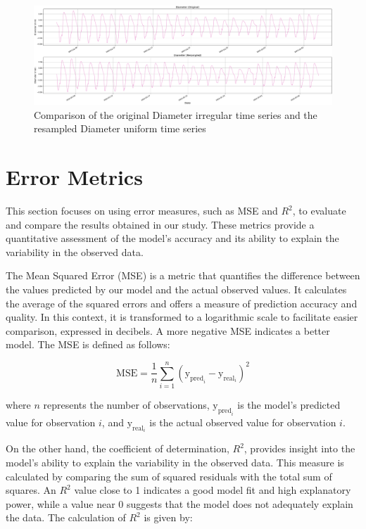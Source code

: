 \begin{figure}[htbp]
    \centering
    \includegraphics[width=15 cm]{5_ChapterDesign/figuras/5_Irregular/comparison_Diameter.pdf}
    \caption{Comparison of the original Diameter irregular time series and the resampled Diameter uniform time series}
    \label{comparison_Diameter}
\end{figure}

\section{Error Metrics}

This section focuses on using error measures, such as MSE and \( R^2 \), to evaluate and compare the results obtained in our study. These metrics provide a quantitative assessment of the model's accuracy and its ability to explain the variability in the observed data.

The Mean Squared Error (MSE) is a metric that quantifies the difference between the values predicted by our model and the actual observed values. It calculates the average of the squared errors and offers a measure of prediction accuracy and quality. In this context, it is transformed to a logarithmic scale to facilitate easier comparison, expressed in decibels. A more negative MSE indicates a better model. The MSE is defined as follows:

\begin{equation}
    \text{MSE} = \frac{1}{n} \sum_{i=1}^{n} \left( \text{y}_{\text{pred}_i} - \text{y}_{\text{real}_i} \right)^2
\end{equation}
    
where \( n \) represents the number of observations, \( \text{y}_{\text{pred}_i} \) is the model's predicted value for observation \( i \), and \( \text{y}_{\text{real}_i} \) is the actual observed value for observation \( i \).

On the other hand, the coefficient of determination, \( R^2 \), provides insight into the model's ability to explain the variability in the observed data. This measure is calculated by comparing the sum of squared residuals with the total sum of squares. An \( R^2 \) value close to 1 indicates a good model fit and high explanatory power, while a value near 0 suggests that the model does not adequately explain the data. The calculation of \( R^2 \) is given by:

